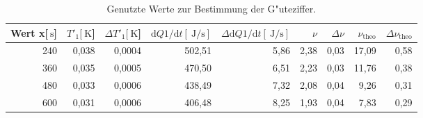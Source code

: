 
\begin{table}[h!]
\begin{center}
\begin{tabular}{|r|r|r|r|r|r|r|r|r|}
\hline
Wert x[$\SI{}{\second}$] & $T'_\mathrm{1}[\SI{}{\kelvin}$] & $\Delta T'_\mathrm{1}[\SI{}{\kelvin}$] & $\mathrm{d}Q1/\mathrm{d}t[\SI{}{\joule\per\second}]$ & $\Delta\mathrm{d}Q1/\mathrm{d}t[\SI{}{\joule\per\second}]$ & $\nu$ & $\Delta\nu$ & $\nu_\mathrm{theo}$ & $\Delta\nu_\mathrm{theo}$\\
\hline
\hline
240 &	0,038 &	0,0004 &	502,51 &	5,86 &	2,38 &	0,03 & 17,09 &	0,58\\
360 &	0,035 &	0,0005 &	470,50 &	6,51 &	2,23 &	0,03 & 11,76 &	0,38\\
480 &	0,033 &	0,0006 &	438,49 &	7,32 &	2,08 &	0,04 &  9,26 &	0,31\\
600 &	0,031 &	0,0006 &	406,48 &	8,25 &	1,93 &	0,04 &  7,83 &	0,29\\
\hline
\end{tabular}
\caption[]{Genutzte Werte zur Bestimmung der G"uteziffer.}
\label{guete}
\end{center}
\end{table}